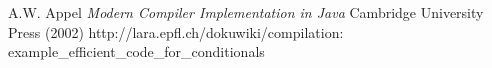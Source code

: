 \documentclass[a4paper]{article}
\begin{document}
\begin{thebibliography}{99}
  A.W. Appel {\it Modern Compiler Implementation in Java}
    Cambridge University Press (2002)
  \mbox{http://lara.epfl.ch/dokuwiki/compilation:} \mbox{example\_efficient\_code\_for\_conditionals}
\end{thebibliography}
\end{document}
